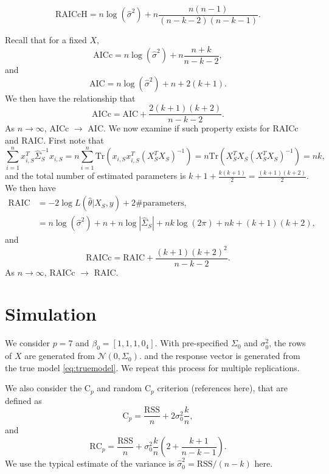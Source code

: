 \documentclass[11pt]{article}
\begin{document}
{\begin{equation}
\text{RAICcH} = n\log (\hat \sigma^2) + n \frac{n(n-1)}{(n-k-2)(n-k-1)}.
\label{eq:raicc}
\end{equation}

Recall that for a fixed $X$,
\begin{equation}
\text{AICc} = n\log (\hat \sigma^2) + n\frac{n+k}{n-k-2},
\label{eq:aicc}
\end{equation}
and 
\begin{equation}
\text{AIC} = n\log (\hat \sigma^2) + n + 2(k+1).
\label{eq:aic}
\end{equation}
We then have the relationship that
$$
\text{AICc} = \text{AIC} + \frac{2(k+1)(k+2)}{n-k-2}.
$$
As $n \rightarrow \infty$, AICc $\rightarrow$ AIC. We now examine if such property exists for RAICc and RAIC. First note that
$$
\sum_{i=1}^n x_{i,S}^T \hat{\Sigma}_S^{-1} x_{i,S} = n \sum_{i=1}^n \text{Tr}(x_{i,S} x_{i,S}^T (X_S^T X_S)^{-1}) = n \text{Tr} ( X_S^T X_S (X_S^T X_S)^{-1}) = nk,
$$ 
and the total number of estimated parameters is $k+1+\frac{k(k+1)}{2} = \frac{(k+1)(k+2)}{2}$.
We then have
\begin{equation}
\begin{aligned}
  \text{RAIC} &= -2\log L(\hat{\theta} | X_S, y) + 2 \#\text{parameters} ,\\
  &= n\log (\hat \sigma^2) + n + n\log |\hat \Sigma_S| + nk \log(2\pi) + nk + (k+1)(k+2),
\end{aligned}
\label{eq:raic}
\end{equation}
and 
$$
\text{RAICc} = \text{RAIC} + \frac{(k+1)(k+2)^2}{n-k-2}.
$$
As $n \rightarrow \infty$, RAICc $\rightarrow$ RAIC.


\section{Simulation}
We consider $p=7$ and $\beta_0 = [1,1,1,0_4]$. With pre-specified $\Sigma_0$ and $\sigma_0^2$, the rows of $X$ are generated from $\mathcal{N}(0,\Sigma_0)$. and the response vector is generated from the true model \eqref{eq:truemodel}. We repeat this process for multiple replications. 


We also consider the C$_p$ and random C$_p$ criterion (references here), that are defined as
\begin{equation}
  \text{C}_p = \frac{ \text{RSS} }{n} + 2 \sigma_0^2\frac{ k }{n},
  \label{eq:cp}
\end{equation}
and 
\begin{equation}
  \text{RC}_p = \frac{ \text{RSS} }{n} + \sigma_0^2\frac{ k }{n}\left(2+\frac{k+1}{n-k-1}\right).
  \label{eq:rcp}
\end{equation}
We use the typical estimate of the variance is $\hat{\sigma}_0^2 = \text{RSS}/(n-k)$ here.

}
\end{document}

